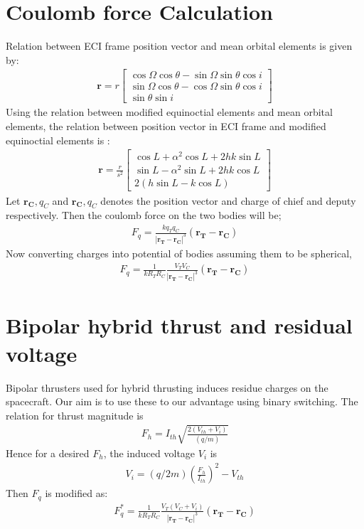 \documentclass[]{article}
\theoremstyle{remark}
\theoremstyle{definition}
\begin{document}
	\section{Coulomb force Calculation}
	Relation between ECI frame position vector and mean orbital elements is given by:
	\begin{align}
		\mathbf{r} = r\begin{bmatrix}
			\cos{\Omega}\cos{\theta}-\sin{\Omega}\sin{\theta}\cos{i} \\ \sin{\Omega}\cos{\theta}-\cos{\Omega}\sin{\theta}\cos{i} \\ \sin{\theta}\sin{i}
		\end{bmatrix} 
	\end{align}
	Using the relation between modified equinoctial elements and mean orbital elements, the relation between position vector in ECI frame and modified equinoctial elements is :
	\begin{align}
		\mathbf{r} = \frac{r}{s^2}\begin{bmatrix}
			\cos{L}+\alpha^2\cos{L}+2hk\sin{L} \\ \sin{L}- \alpha^2\sin{L}+2hk\cos{L} \\ 2(h\sin{L}-k\cos{L})
		\end{bmatrix}  
	\end{align}
	Let $\mathbf{r_C},q_C$ and $\mathbf{r_C},q_C$ denotes the position vector and charge of chief and deputy respectively. Then the coulomb force on the two bodies will be;
	\begin{align}
		F_q = \frac{kq_T q_C}{| \mathbf{r_T-r_C}|^3}(\mathbf{r_T-r_C})
	\end{align}
	Now converting charges into potential of bodies assuming them to be spherical,
	\begin{align}
		F_q = \frac{1}{kR_T R_C}\frac{V_T V_C}{| \mathbf{r_T-r_C}|^3}(\mathbf{r_T-r_C})
	\end{align}
	\section{Bipolar hybrid thrust and residual voltage}
	Bipolar thrusters used for hybrid thrusting induces residue charges on the spacecraft. Our aim is to use these to our advantage using binary switching.
	The relation for thrust magnitude is 
	\begin{align}
		F_h = I_{th}\sqrt{\frac{2(V_{th}+V_i)}{(q/m)}} 
	\end{align}
	Hence for a desired $F_h$, the induced voltage $V_i$ is
	\begin{align}
		V_i = (q/2m)\left(\frac{F_h}{I_{th}}\right)^2 - V_{th}
	\end{align}
	Then $F_q$ is modified as:
	\begin{align}
		F_q^* = \frac{1}{kR_T R_C}\frac{V_T (V_C+V_i)}{| \mathbf{r_T-r_C}|^3}(\mathbf{r_T-r_C})
	\end{align}
\end{document}
